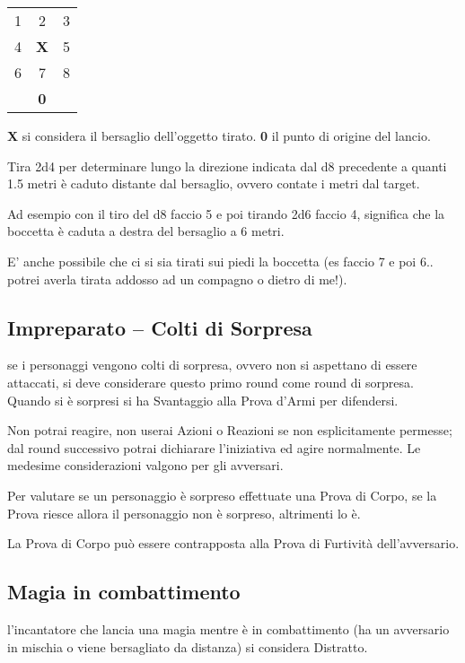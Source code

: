 \documentclass[12pt,a4paper,twoside,openany]{book}
\begin{document}
\begin{multicols}{2}
\begin{tabularx}{0.30\textwidth}{ccc}
1& 2& 3\\
4 &\textbf{X}& 5\\
6 &7 &8\\
&\textbf{0}&\\
\end{tabularx}

\smallskip

\textbf{X} si considera il bersaglio dell'oggetto tirato. \textbf{0} il punto di origine del lancio.

Tira 2d4 per determinare lungo la direzione indicata dal d8 precedente a quanti 1.5 metri è caduto distante dal bersaglio, ovvero contate i metri dal target.

Ad esempio con il tiro del d8 faccio 5 e poi tirando 2d6 faccio 4, significa che la boccetta è caduta a destra del bersaglio a 6 metri.

E' anche possibile che ci si sia tirati sui piedi la boccetta (es faccio 7 e poi 6.. potrei averla tirata addosso ad un compagno o dietro di me!).

\subsection{Impreparato -- Colti di Sorpresa}\label{coltidisorpresa}

se i personaggi vengono colti di sorpresa, ovvero non si aspettano di essere attaccati, si deve considerare questo primo round come round di sorpresa. Quando si è sorpresi si ha Svantaggio alla Prova d'Armi per difendersi.

Non potrai reagire, non userai Azioni o Reazioni se non esplicitamente permesse; dal round successivo potrai dichiarare l'iniziativa ed agire normalmente. Le medesime considerazioni valgono per gli avversari.

Per valutare se un personaggio è sorpreso effettuate una Prova di Corpo, se la Prova riesce allora il personaggio non è sorpreso, altrimenti lo è.

La Prova di Corpo può essere contrapposta alla Prova di Furtività dell'avversario.

\subsection{Magia in combattimento}\label{magiaincombattimento}

l'incantatore che lancia una magia mentre è in combattimento (ha un avversario in mischia o viene bersagliato da distanza) si considera Distratto.


\end{multicols}
\end{document}
